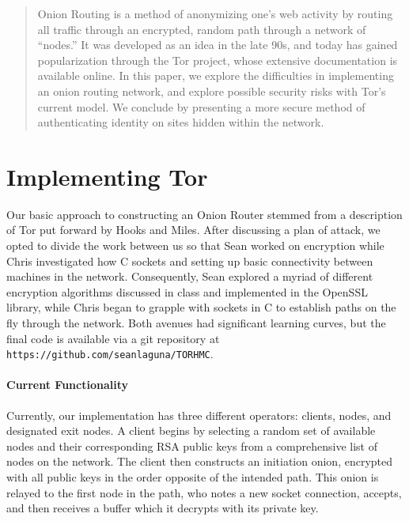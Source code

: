 \documentclass[12pt]{article}
\begin{document}
\maketitle

\begin{abstract}
Onion Routing is a method of anonymizing one's web activity by routing all traffic through an encrypted, random path through a network of ``nodes.'' It was developed as an idea in the late 90s\cite{gold}, and today has gained popularization through the Tor project, whose extensive documentation is available online\cite{tor}. In this paper, we explore the difficulties in implementing an onion routing network, and explore possible security risks with Tor's current model. We conclude by presenting a more secure method of authenticating identity on sites hidden within the network.
\end{abstract}

\section{Implementing Tor}
Our basic approach to constructing an Onion Router stemmed from a description of Tor put forward by Hooks and Miles\cite{hook}. After discussing a plan of attack, we opted to divide the work between us so that Sean worked on encryption while Chris investigated how C sockets and setting up basic connectivity between machines in the network. Consequently, Sean explored a myriad of different encryption algorithms discussed in class and implemented in the OpenSSL library, while Chris began to grapple with sockets in C to establish paths on the fly through the network. Both avenues had significant learning curves, but the final code is available via a git repository at {\tt https://github.com/seanlaguna/TORHMC}.

\paragraph{Current Functionality}
Currently, our implementation has three different operators: clients, nodes, and designated exit nodes. A client begins by selecting a random set of available nodes and their corresponding RSA public keys from a comprehensive list of nodes on the network. The client then constructs an initiation onion, encrypted with all public keys in the order opposite of the intended path. This onion is relayed to the first node in the path, who notes a new socket connection, accepts, and then receives a buffer which it decrypts with its private key.
\end{document}
